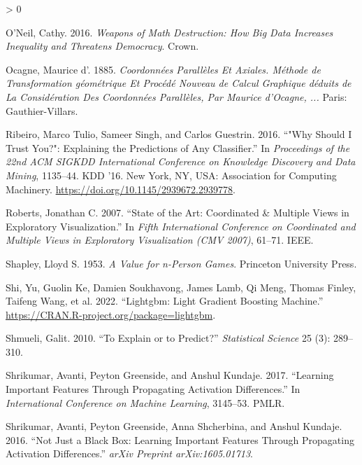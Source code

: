 \documentclass[
]{article}
\newlength{\cslhangindent}
\newenvironment{CSLReferences}[2] %
 {%
  \setlength{\parindent}{0pt}
  \ifodd #1 \everypar{\setlength{\hangindent}{\cslhangindent}}\ignorespaces\fi
  \ifnum #2 > 0
  \setlength{\parskip}{#2\baselineskip}
  \fi
 }%
 {}
\begin{document}
\begin{CSLReferences}{1}{0}
\leavevmode\hypertarget{ref-oneil_weapons_2016}{}%
O'Neil, Cathy. 2016. \emph{Weapons of Math Destruction: {How} Big Data
Increases Inequality and Threatens Democracy}. Crown.

\leavevmode\hypertarget{ref-ocagne_coordonnees_1885}{}%
Ocagne, Maurice d'. 1885. \emph{Coordonnées Parallèles Et Axiales.
{Méthode} de Transformation géométrique Et Procédé Nouveau de Calcul
Graphique déduits de La Considération Des Coordonnées Parallèles, Par
{Maurice} d'{Ocagne}, ...} Paris: Gauthier-Villars.

\leavevmode\hypertarget{ref-ribeiro_why_2016}{}%
Ribeiro, Marco Tulio, Sameer Singh, and Carlos Guestrin. 2016. {``"{Why}
{Should} {I} {Trust} {You}?": {Explaining} the {Predictions} of {Any}
{Classifier}.''} In \emph{Proceedings of the 22nd {ACM} {SIGKDD}
{International} {Conference} on {Knowledge} {Discovery} and {Data}
{Mining}}, 1135--44. {KDD} '16. New York, NY, USA: Association for
Computing Machinery. \url{https://doi.org/10.1145/2939672.2939778}.

\leavevmode\hypertarget{ref-roberts_state_2007}{}%
Roberts, Jonathan C. 2007. {``State of the Art: {Coordinated} \&
Multiple Views in Exploratory Visualization.''} In \emph{Fifth
International Conference on Coordinated and Multiple Views in
Exploratory Visualization ({CMV} 2007)}, 61--71. IEEE.

\leavevmode\hypertarget{ref-shapley_value_1953}{}%
Shapley, Lloyd S. 1953. \emph{A Value for n-Person Games}. Princeton
University Press.

\leavevmode\hypertarget{ref-shi_lightgbm_2022}{}%
Shi, Yu, Guolin Ke, Damien Soukhavong, James Lamb, Qi Meng, Thomas
Finley, Taifeng Wang, et al. 2022. {``Lightgbm: {Light} {Gradient}
{Boosting} {Machine}.''}
\url{https://CRAN.R-project.org/package=lightgbm}.

\leavevmode\hypertarget{ref-shmueli_explain_2010}{}%
Shmueli, Galit. 2010. {``To Explain or to Predict?''} \emph{Statistical
Science} 25 (3): 289--310.

\leavevmode\hypertarget{ref-shrikumar_learning_2017}{}%
Shrikumar, Avanti, Peyton Greenside, and Anshul Kundaje. 2017.
{``Learning Important Features Through Propagating Activation
Differences.''} In \emph{International {Conference} on {Machine}
{Learning}}, 3145--53. PMLR.

\leavevmode\hypertarget{ref-shrikumar_not_2016}{}%
Shrikumar, Avanti, Peyton Greenside, Anna Shcherbina, and Anshul
Kundaje. 2016. {``Not Just a Black Box: {Learning} Important Features
Through Propagating Activation Differences.''} \emph{arXiv Preprint
arXiv:1605.01713}.


\end{CSLReferences}
\end{document}

